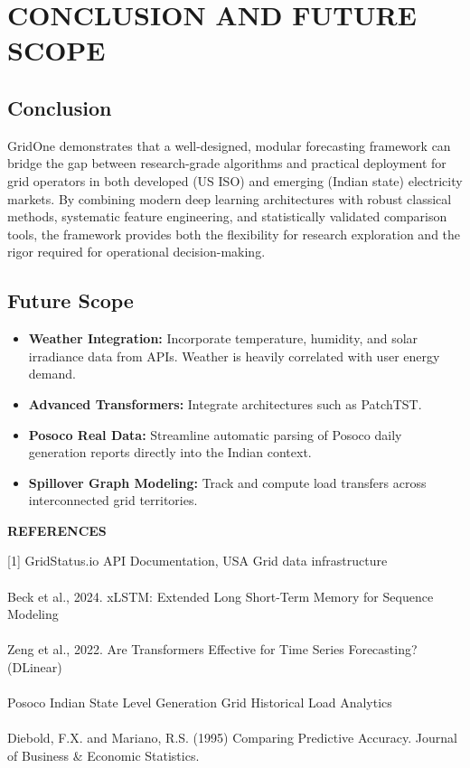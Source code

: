 \documentclass[ 12pt,a4paper,twocolumn,fleqn]{report}
\begin{document}
\newpage
  \pagestyle{fancy}
\thisfancypage{%
  \setlength{\fboxsep}{20pt}\doublebox}{}
\normalsize
\chapter{CONCLUSION AND FUTURE SCOPE}
\section{Conclusion}
GridOne demonstrates that a well-designed, modular forecasting framework can bridge the gap between research-grade algorithms and practical deployment for grid operators in both developed (US ISO) and emerging (Indian state) electricity markets. By combining modern deep learning architectures with robust classical methods, systematic feature engineering, and statistically validated comparison tools, the framework provides both the flexibility for research exploration and the rigor required for operational decision-making.

\section{Future Scope}
\vspace{2mm}
\begin{itemize}
    \item \textbf{Weather Integration:} Incorporate temperature, humidity, and solar irradiance data from APIs. Weather is heavily correlated with user energy demand.
    \item \textbf{Advanced Transformers:} Integrate architectures such as PatchTST.
    \item \textbf{Posoco Real Data:} Streamline automatic parsing of Posoco daily generation reports directly into the Indian context.
    \item \textbf{Spillover Graph Modeling:} Track and compute load transfers across interconnected grid territories.
\end{itemize}

\newpage
  \pagestyle{fancy}
\thisfancypage{%
  \setlength{\fboxsep}{20pt}\doublebox}{}
\begin{center}
    \huge\textbf{REFERENCES}
\end{center}
\vspace{10mm}
\normalsize
[1] GridStatus.io API Documentation, USA Grid data infrastructure \\
\hfill\\
[2] Beck et al., 2024. xLSTM: Extended Long Short-Term Memory for Sequence Modeling \\
\hfill\\
[3] Zeng et al., 2022. Are Transformers Effective for Time Series Forecasting? (DLinear) \\
\hfill\\
[4] Posoco Indian State Level Generation Grid Historical Load Analytics \\
\hfill\\
[5] Diebold, F.X. and Mariano, R.S. (1995) Comparing Predictive Accuracy. Journal of Business \& Economic Statistics.\\
\end{document}
